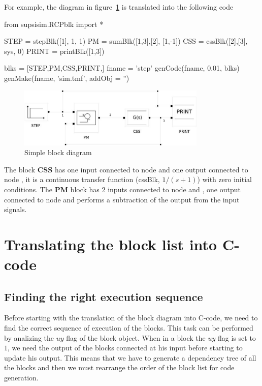 For example, the diagram in figure~\ref{F18} is translated into the following 
code

\begin{code}
from supsisim.RCPblk import *

STEP = stepBlk([1],  1,  1)
PM = sumBlk([1,3],[2],  [1,-1])
CSS = cssBlk([2],[3],  sys,  0)
PRINT = printBlk([1,3])

blks = [STEP,PM,CSS,PRINT,]
fname = 'step'
genCode(fname, 0.01, blks)
genMake(fname, 'sim.tmf', addObj = '')
\end{code}



\begin{figure}[htbp]	%
\centering
\includegraphics[width=0.8\textwidth]{eps/step1.eps}
\caption{Simple block diagram}
\label{F18}
\end{figure}

The block \textbf{CSS} has one input connected to node  and 
one output connected to node , it is a continuous transfer function 
(cssBlk, $1/(s+1)$) with zero initial conditions. The \textbf{PM} block has 
2 inputs connected to node  and , one output 
connected to node  and performs a subtraction of the output from the 
input signals.

\section{Translating the block list into C-code}
\subsection{Finding the right execution sequence}
Before starting with the translation of the block diagram into C-code, we need 
to find the correct sequence of execution of the blocks. This task can be 
performed by analizing the $uy$ flag of the block object. 
When in a block the $uy$ flag is set to $1$, we need the output of the blocks 
connected at his input before starting to update his output.
This means that we have to generate a dependency tree of all the blocks and 
then we must rearrange the order of the block list for code generation.

